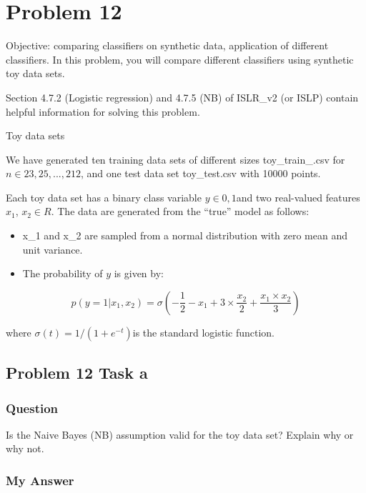 \documentclass[
]{article}
\begin{document}
\hypertarget{problem-12}{%
\section{Problem 12}\label{problem-12}}

Objective: comparing classifiers on synthetic data, application of
different classifiers. In this problem, you will compare different
classifiers using synthetic toy data sets.

Section 4.7.2 (Logistic regression) and 4.7.5 (NB) of ISLR\_v2 (or ISLP)
contain helpful information for solving this problem.

Toy data sets

We have generated ten training data sets of different sizes
toy\_train\_.csv for \(n \in {23, 25, ..., 212}\), and one test data set
toy\_test.csv with 10000 points.

Each toy data set has a binary class variable \(y \in {0,1}\)and two
real-valued features \(x_1\), \(x_2 \in R\). The data are generated from
the ``true'' model as follows:

\begin{itemize}
\item
  x\_1 and x\_2 are sampled from a normal distribution with zero mean
  and unit variance.
\item
  The probability of \(y\) is given by:
\end{itemize}

\[
  p(y=1|x_1, x_2) = \sigma(-\frac{1}{2}-x_1 + 3 \times \frac{x_2}{2} + \frac{x_1 \times x_2}{3} )
\]

where \(\sigma(t) = 1/(1 + e^{-t})\)is the standard logistic function.

\hypertarget{problem-12-task-a}{%
\subsection{Problem 12 Task a}\label{problem-12-task-a}}

\hypertarget{question-8}{%
\subsubsection{Question}\label{question-8}}

Is the Naive Bayes (NB) assumption valid for the toy data set? Explain
why or why not.

\hypertarget{my-answer-8}{%
\subsubsection{My Answer}\label{my-answer-8}}
\end{document}
